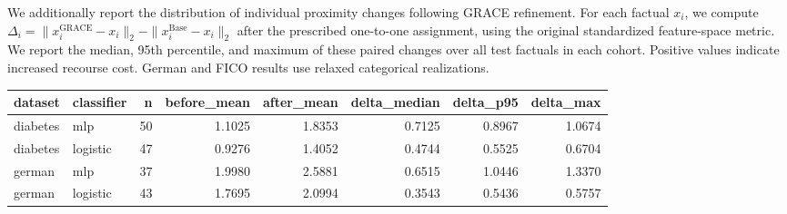 We additionally report the distribution of individual proximity changes
following GRACE refinement. For each factual $x_i$, we compute
$\Delta_i=\|x_i^{\mathrm{GRACE}}-x_i\|_2-
\|x_i^{\mathrm{Base}}-x_i\|_2$
after the prescribed one-to-one assignment, using the original standardized
feature-space metric. We report the median, 95th percentile, and maximum
of these paired changes over all test factuals in each cohort. Positive values indicate
increased recourse cost. German and FICO results use relaxed categorical realizations.

\begin{tabular}{llrrrrrr}
\toprule
dataset & classifier & n & before_mean & after_mean & delta_median & delta_p95 & delta_max \\
\midrule
diabetes & mlp & 50 & 1.1025 & 1.8353 & 0.7125 & 0.8967 & 1.0674 \\
diabetes & logistic & 47 & 0.9276 & 1.4052 & 0.4744 & 0.5525 & 0.6704 \\
german & mlp & 37 & 1.9980 & 2.5881 & 0.6515 & 1.0446 & 1.3370 \\
german & logistic & 43 & 1.7695 & 2.0994 & 0.3543 & 0.5436 & 0.5757 \\
\bottomrule
\end{tabular}
